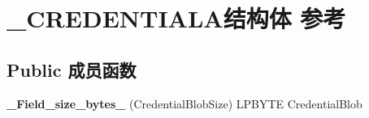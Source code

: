 \hypertarget{struct___c_r_e_d_e_n_t_i_a_l_a}{}\section{\+\_\+\+C\+R\+E\+D\+E\+N\+T\+I\+A\+L\+A结构体 参考}
\label{struct___c_r_e_d_e_n_t_i_a_l_a}
\subsection*{Public 成员函数}
\begin{DoxyCompactItemize}
\item 
\mbox{\label{struct___c_r_e_d_e_n_t_i_a_l_a_ab5037a4ac3ddf2ffa58ac5b2393f88c4}} 
{\bfseries \+\_\+\+Field\+\_\+size\+\_\+bytes\+\_\+} (Credential\+Blob\+Size) L\+P\+B\+Y\+TE Credential\+Blob
\end{DoxyCompactItemize}
